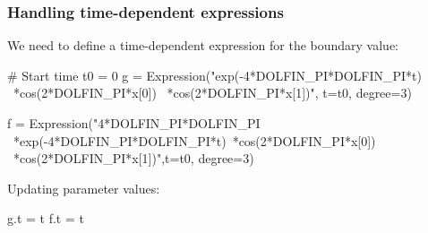 \begin{frame}[fragile]
  \frametitle{Handling time-dependent expressions}
  \vspace{1em}
  We need to define a time-dependent expression for the boundary value:
{\tiny
  \begin{python}
# Start time
t0 = 0
g = Expression("exp(-4*DOLFIN_PI*DOLFIN_PI*t) \
               *cos(2*DOLFIN_PI*x[0]) \
               *cos(2*DOLFIN_PI*x[1])", t=t0, degree=3)

f = Expression("4*DOLFIN_PI*DOLFIN_PI \
        *exp(-4*DOLFIN_PI*DOLFIN_PI*t)\
        *cos(2*DOLFIN_PI*x[0]) \
        *cos(2*DOLFIN_PI*x[1])",t=t0, degree=3)
  \end{python}
}

Updating parameter values:
\vspace{-1em}
  \begin{python}
g.t = t
f.t = t
  \end{python}
\end{frame}
